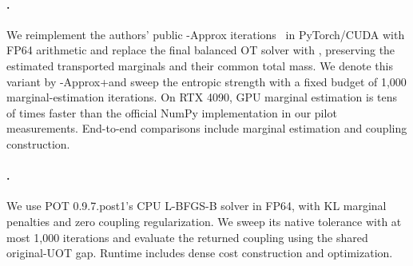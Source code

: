 \paragraph{\etm.}
We reimplement the authors' public \etm-Approx iterations~\citep{liu2026solving} in PyTorch/CUDA with FP64 arithmetic and replace the final balanced OT solver with \hello, preserving the estimated transported marginals and their common total mass.
We denote this variant by \etm-Approx+\hello and sweep the entropic strength with a fixed budget of 1,000 marginal-estimation iterations.
On RTX 4090, GPU marginal estimation is tens of times faster than the official NumPy implementation in our pilot measurements.
End-to-end comparisons include marginal estimation and \hello coupling construction.

\paragraph{\potlbfgsb.}
We use POT 0.9.7.post1's CPU L-BFGS-B solver in FP64, with KL marginal penalties and zero coupling regularization.
We sweep its native tolerance with at most 1,000 iterations and evaluate the returned coupling using the shared original-UOT gap.
Runtime includes dense cost construction and optimization.

